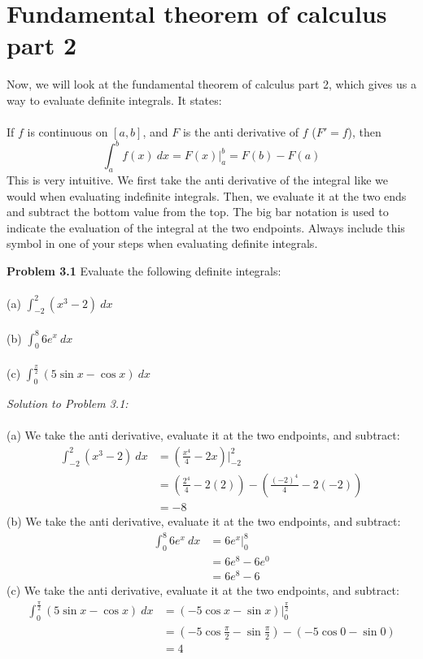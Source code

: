 \documentclass[11pt]{scrartcl}
\begin{document}
\section{Fundamental theorem of calculus part 2}
\noindent 
Now, we will look at the fundamental theorem of calculus part 2, which gives us a way to evaluate definite integrals. It states: \\
\\
\noindent 
If $f$ is continuous on $[a,b]$, and $F$ is the anti derivative of $f$ ($F'=f$), then 
$$\int_a^b{f(x)} \ dx=F(x)\biggr\rvert_a^b=F(b)-F(a)$$
\noindent 
This is very intuitive. We first take the anti derivative of the integral like we would when evaluating indefinite integrals. Then, we evaluate it at the two ends and subtract the bottom value from the top. The big bar notation is used to indicate the evaluation of the integral at the two endpoints. Always include this symbol in one of your steps when evaluating definite integrals. 
\begin{tcolorbox}[colback=purple!5!white,colframe=purple!75!black]
\textbf{Problem 3.1} Evaluate the following definite integrals: \\
\\
\noindent 
(a) $\int_{-2}^2 (x^3-2) \ dx$ \\
\\
\noindent 
(b) $\int_0^8 6e^x \ dx$ \\
\\
\noindent 
(c) $\int_{0}^{\frac{\pi}{2}} (5\sin{x}-\cos x) \ dx$\\
\end{tcolorbox}
\noindent 
\textit{Solution to Problem 3.1:} \\
\\
\noindent 
(a) We take the anti derivative, evaluate it at the two endpoints, and subtract: 
\begin{align*}
    \int_{-2}^2 (x^3-2) \ dx    
                         &=\left(\frac{x^4}{4}-2x\right)\biggr\rvert_{-2}^2 \\
                         &=\left(\frac{2^4}{4}-2(2)\right)-\left(\frac{(-2)^4}{4}-2(-2)\right) \\
                         &=-8
\end{align*} 
\noindent 
(b) We take the anti derivative, evaluate it at the two endpoints, and subtract: 
\begin{align*}
    \int_0^8 6e^x \ dx &=6e^x\biggr\rvert_0^8 \\
                       &=6e^8-6e^0 \\
                       &=6e^8-6
\end{align*}
\noindent 
(c) We take the anti derivative, evaluate it at the two endpoints, and subtract: 
\begin{align*}
    \int_0^{\frac{\pi}{2}}(5\sin x-\cos x) \ dx &=(-5\cos x-\sin x)\biggr\rvert_0^{\frac{\pi}{2}} \\
                                                &=(-5\cos \frac{\pi}{2}-\sin \frac{\pi}{2})-(-5\cos 0-\sin 0) \\
                                                &=4
\end{align*}
\end{document}
